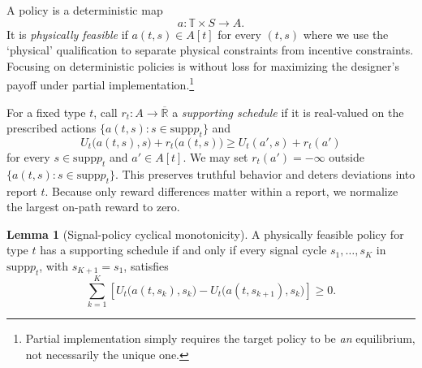 \documentclass[12pt,reqno]{article}
\newcommand{\supp}{\mathrm{supp}}
\newcommand{\Rbar}{\overline{\mathbb{R}}}
\theoremstyle{definition} \newtheorem{example}{Example}
\theoremstyle{definition} \newtheorem{condition}{Condition}
\theoremstyle{definition} \newtheorem{corollary}{Corollary}
\theoremstyle{definition} \newtheorem{claim}{Claim}
\theoremstyle{definition} \newtheorem{definition}{Definition}
\theoremstyle{definition} \newtheorem{conjecture}{Conjecture}
\theoremstyle{definition} \newtheorem{Lemma}{Lemma}
\theoremstyle{definition} \newtheorem{lemma}{Lemma}
\theoremstyle{plain} \newtheorem{theorem}{Theorem}
\theoremstyle{definition} \newtheorem{assumption}{Assumption}
\theoremstyle{definition} \newtheorem*{assumptionnonumber}{Assumption}
\theoremstyle{definition} \newtheorem*{theoremNoNumber}{Proposition}
\theoremstyle{definition}\newtheorem{proposition}{Proposition}
\theoremstyle{definition} \newtheorem{observation}{Observation}
\theoremstyle{definition} \newtheorem*{definitionNoNumber}{Definition}
\theoremstyle{definition} \newtheorem{Definition}{Definition}
\theoremstyle{definition} \newtheorem*{DefinitionNoNumber}{Definition}
\theoremstyle{definition} \newtheorem*{fact}{Fact}
\theoremstyle{definition} \newtheorem*{property}{Property}
\theoremstyle{definition} \newtheorem{remark}{Remark}
\theoremstyle{definition}\newtheorem{romanexampleinner}{Example}
\begin{document}
A policy is a deterministic map
\[
a:\mathbb T\times S\to A. 
\]
It is \emph{physically feasible} if $a(t,s)\in A[t]$ for every $(t,s)$ where we use the `physical' qualification to separate physical constraints from incentive constraints. Focusing on deterministic policies is without loss for maximizing the designer's payoff under partial implementation.\footnote{Partial implementation simply requires the target policy to be \emph{an} equilibrium, not necessarily the unique one.}

For a fixed type $t$, call $r_t:A\to\Rbar$ a \emph{supporting schedule} if it is real-valued on the prescribed actions $\{a(t,s):s\in\supp p_t\}$ and
\[
U_t\big(a(t,s),s\big)+r_t\big(a(t,s)\big)
\geq
U_t(a',s)+r_t(a')
\]
for every $s\in\supp p_t$ and $a'\in A[t]$. We may set $r_t(a')=-\infty$ outside $\{a(t,s):s\in\supp p_t\}$. This preserves truthful behavior and deters deviations into report $t$. Because only reward differences matter within a report, we normalize the largest on-path reward to zero.

\begin{lemma}[Signal-policy cyclical monotonicity]\label{lem:signal-cm}
A physically feasible policy for type $t$ has a supporting schedule if and only if every signal cycle $s_1,\ldots,s_K$ in $\supp p_t$, with $s_{K+1}=s_1$, satisfies
\begin{equation*}
\sum_{k=1}^K
\left[
U_t\big(a(t,s_k),s_k\big)
-U_t\big(a(t,s_{k+1}),s_k\big)
\right]
\geq0.
\tag{O} \label{cond:obedience}
\end{equation*}
\end{lemma}
\end{document}
